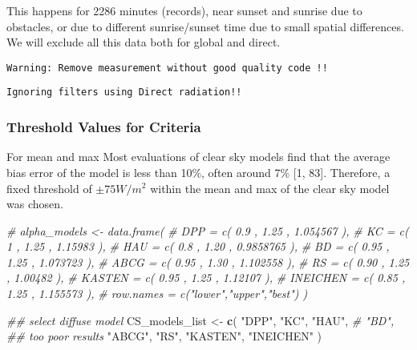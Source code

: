\documentclass[
  10pt,
  a4paper,oneside]{article}
\newenvironment{Shaded}{\begin{snugshade}}{\end{snugshade}}
\newcommand{\CommentTok}[1]{\textcolor[rgb]{0.56,0.35,0.01}{\textit{#1}}}
\newcommand{\KeywordTok}[1]{\textcolor[rgb]{0.13,0.29,0.53}{\textbf{#1}}}
\newcommand{\NormalTok}[1]{#1}
\newcommand{\StringTok}[1]{\textcolor[rgb]{0.31,0.60,0.02}{#1}}
\begin{document}
This happens for 2286
minutes (records), near sunset and sunrise due to obstacles,
or due to different sunrise/sunset time due to small spatial differences.
We will exclude all this data both for global and direct.

\begin{verbatim}
Warning: Remove measurement without good quality code !!
\end{verbatim}

\begin{verbatim}
Ignoring filters using Direct radiation!!
\end{verbatim}

\hypertarget{threshold-values-for-criteria}{%
\subsubsection{Threshold Values for Criteria}\label{threshold-values-for-criteria}}

For mean and max Most evaluations of clear sky models find that the average
bias error of the model is less than 10\%, often around 7\% {[}1, 83{]}. Therefore,
a fixed threshold of \(\pm 75 W / m^2\) within the mean and max of the clear sky model
was chosen.

\begin{Shaded}
\begin{Highlighting}[]
\CommentTok{\# alpha\_models \textless{}{-} data.frame(}
\CommentTok{\#     DPP      = c( 0.9  , 1.25 , 1.054567  ),}
\CommentTok{\#     KC       = c( 1    , 1.25 , 1.15983   ),}
\CommentTok{\#     HAU      = c( 0.8  , 1.20 , 0.9858765 ),}
\CommentTok{\#     BD       = c( 0.95 , 1.25 , 1.073723  ),}
\CommentTok{\#     ABCG     = c( 0.95 , 1.30 , 1.102558  ),}
\CommentTok{\#     RS       = c( 0.90 , 1.25 , 1.00482   ),}
\CommentTok{\#     KASTEN   = c( 0.95 , 1.25 , 1.12107   ),}
\CommentTok{\#     INEICHEN = c( 0.85 , 1.25 , 1.155573  ),}
\CommentTok{\#     row.names = c("lower","upper","best") )}

\CommentTok{\#\# select diffuse model}
\NormalTok{CS\_models\_list \textless{}{-}}\StringTok{ }\KeywordTok{c}\NormalTok{(}
                    \StringTok{"DPP"}\NormalTok{,}
                    \StringTok{"KC"}\NormalTok{,}
                    \StringTok{"HAU"}\NormalTok{,}
                    \CommentTok{\# "BD",       \#\# too poor results}
                    \StringTok{"ABCG"}\NormalTok{,}
                    \StringTok{"RS"}\NormalTok{,}
                    \StringTok{"KASTEN"}\NormalTok{,}
                    \StringTok{"INEICHEN"}
\NormalTok{                  )}
\end{Highlighting}
\end{Shaded}
\end{document}

